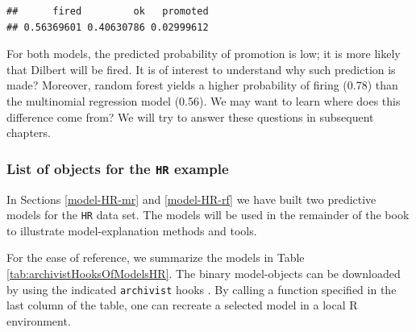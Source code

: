 \documentclass[12pt,]{krantz}
\begin{document}
\begin{verbatim}
##      fired         ok   promoted 
## 0.56369601 0.40630786 0.02999612
\end{verbatim}

For both models, the predicted probability of promotion is low; it is more likely that Dilbert will be fired. It is of interest to understand why such prediction is made? Moreover, random forest yields a higher probability of firing (0.78) than the multinomial regression model (0.56). We may want to learn where does this difference come from? We will try to answer these questions in subsequent chapters.

\hypertarget{ListOfModelsHR}{%
\subsubsection{\texorpdfstring{List of objects for the \texttt{HR} example}{List of objects for the HR example}}\label{ListOfModelsHR}}

In Sections \ref{model-HR-mr} and \ref{model-HR-rf} we have built two predictive models for the \texttt{HR} data set. The models will be used in the remainder of the book to illustrate model-explanation methods and tools.

For the ease of reference, we summarize the models in Table \ref{tab:archivistHooksOfModelsHR}. The binary model-objects can be downloaded by using the indicated \texttt{archivist} hooks \citep{archivist}. By calling a function specified in the last column of the table, one can recreate a selected model in a local R environment.
\end{document}
